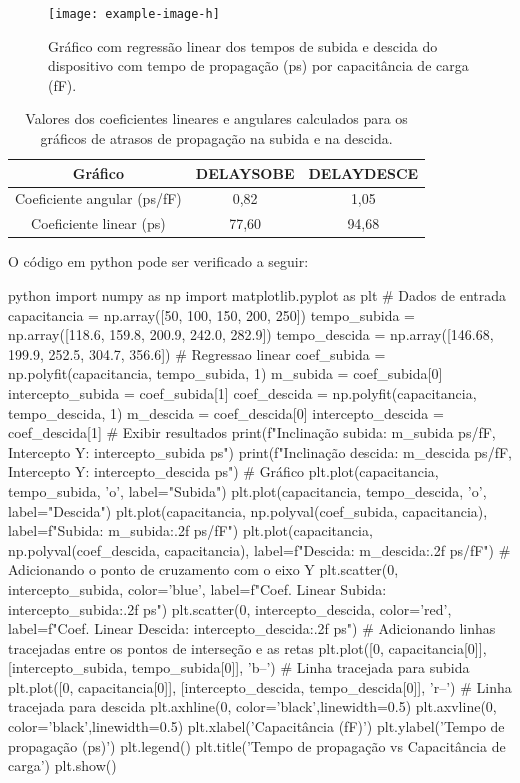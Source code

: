 \documentclass[12pt,a4paper]{article}
\begin{document}
\begin{figure}[H]
    \centering
    \texttt{[image: example-image-h]}
    \caption{Gráfico com regressão linear dos tempos de subida e descida do dispositivo com tempo de propagação (ps) por capacitância de carga (fF).}
    \label{fig:linear_regression}
\end{figure}

\begin{table}[H]
    \centering
    \caption{Valores dos coeficientes lineares e angulares calculados para os gráficos de atrasos de propagação na subida e na descida.}
    \label{tab:coefficients}
    \begin{tabular}{ccc}
        \toprule
        Gráfico & DELAYSOBE & DELAYDESCE \\
        \midrule
        Coeficiente angular (ps/fF) & 0,82 & 1,05 \\
        Coeficiente linear (ps) & 77,60 & 94,68 \\
        \bottomrule
    \end{tabular}
\end{table}

O código em python pode ser verificado a seguir:

\begin{codeblockm}{python}
import numpy as np
import matplotlib.pyplot as plt
# Dados de entrada
capacitancia = np.array([50, 100, 150, 200, 250])
tempo_subida = np.array([118.6, 159.8, 200.9, 242.0, 282.9])
tempo_descida = np.array([146.68, 199.9, 252.5, 304.7, 356.6])
# Regressao linear
coef_subida = np.polyfit(capacitancia, tempo_subida, 1)
m_subida = coef_subida[0]
intercepto_subida = coef_subida[1]
coef_descida = np.polyfit(capacitancia, tempo_descida, 1)
m_descida = coef_descida[0]
intercepto_descida = coef_descida[1]
# Exibir resultados
print(f"Inclinação subida: {m_subida} ps/fF, Intercepto Y: {intercepto_subida} ps")
print(f"Inclinação descida: {m_descida} ps/fF, Intercepto Y: {intercepto_descida} ps")
# Gráfico
plt.plot(capacitancia, tempo_subida, 'o', label="Subida")
plt.plot(capacitancia, tempo_descida, 'o', label="Descida")
plt.plot(capacitancia, np.polyval(coef_subida, capacitancia),
label=f"Subida: {m_subida:.2f} ps/fF")
plt.plot(capacitancia, np.polyval(coef_descida, capacitancia),
label=f"Descida: {m_descida:.2f} ps/fF")
# Adicionando o ponto de cruzamento com o eixo Y
plt.scatter(0, intercepto_subida, color='blue', label=f"Coef. Linear Subida: {intercepto_subida:.2f} ps")
plt.scatter(0, intercepto_descida, color='red', label=f"Coef. Linear Descida: {intercepto_descida:.2f} ps")
# Adicionando linhas tracejadas entre os pontos de interseção e as retas
plt.plot([0, capacitancia[0]], [intercepto_subida, tempo_subida[0]], 'b--')
# Linha tracejada para subida
plt.plot([0, capacitancia[0]], [intercepto_descida, tempo_descida[0]],
'r--') # Linha tracejada para descida
plt.axhline(0, color='black',linewidth=0.5)
plt.axvline(0, color='black',linewidth=0.5)
plt.xlabel('Capacitância (fF)')
plt.ylabel('Tempo de propagação (ps)')
plt.legend()
plt.title('Tempo de propagação vs Capacitância de carga')
plt.show()
\end{codeblockm}
\end{document}
